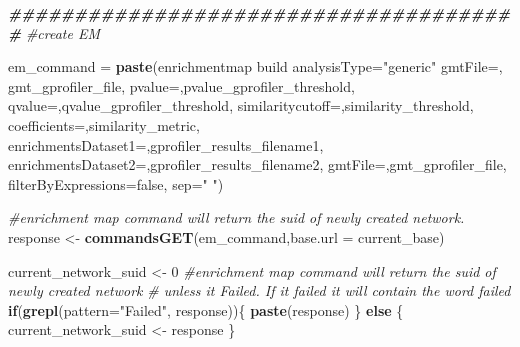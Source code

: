 \documentclass[
]{book}
\newenvironment{Shaded}{\begin{snugshade}}{\end{snugshade}}
\newcommand{\AttributeTok}[1]{\textcolor[rgb]{0.13,0.29,0.53}{#1}}
\newcommand{\CommentTok}[1]{\textcolor[rgb]{0.56,0.35,0.01}{\textit{#1}}}
\newcommand{\ControlFlowTok}[1]{\textcolor[rgb]{0.13,0.29,0.53}{\textbf{#1}}}
\newcommand{\DecValTok}[1]{\textcolor[rgb]{0.00,0.00,0.81}{#1}}
\newcommand{\DocumentationTok}[1]{\textcolor[rgb]{0.56,0.35,0.01}{\textbf{\textit{#1}}}}
\newcommand{\FunctionTok}[1]{\textcolor[rgb]{0.13,0.29,0.53}{\textbf{#1}}}
\newcommand{\NormalTok}[1]{#1}
\newcommand{\OtherTok}[1]{\textcolor[rgb]{0.56,0.35,0.01}{#1}}
\newcommand{\StringTok}[1]{\textcolor[rgb]{0.31,0.60,0.02}{#1}}
\begin{document}
\begin{Shaded}
\begin{Highlighting}[]
\DocumentationTok{\#\#\#\#\#\#\#\#\#\#\#\#\#\#\#\#\#\#\#\#\#\#\#\#\#\#\#\#\#\#\#\#\#\#\#\#\#\#\#}
\CommentTok{\#create EM}

\NormalTok{em\_command }\OtherTok{=} \FunctionTok{paste}\NormalTok{(}\StringTok{\textquotesingle{}enrichmentmap build analysisType="generic" gmtFile=\textquotesingle{}}\NormalTok{,}
\NormalTok{                   gmt\_gprofiler\_file,}
                   \StringTok{\textquotesingle{}pvalue=\textquotesingle{}}\NormalTok{,pvalue\_gprofiler\_threshold, }
                   \StringTok{\textquotesingle{}qvalue=\textquotesingle{}}\NormalTok{,qvalue\_gprofiler\_threshold,}
                   \StringTok{\textquotesingle{}similaritycutoff=\textquotesingle{}}\NormalTok{,similarity\_threshold,}
                   \StringTok{\textquotesingle{}coefficients=\textquotesingle{}}\NormalTok{,similarity\_metric,}
                   \StringTok{\textquotesingle{}enrichmentsDataset1=\textquotesingle{}}\NormalTok{,gprofiler\_results\_filename1, }
                   \StringTok{\textquotesingle{}enrichmentsDataset2=\textquotesingle{}}\NormalTok{,gprofiler\_results\_filename2,}
                   \StringTok{\textquotesingle{}gmtFile=\textquotesingle{}}\NormalTok{,gmt\_gprofiler\_file,}
                   \StringTok{\textquotesingle{}filterByExpressions=false\textquotesingle{}}\NormalTok{,}
                   \AttributeTok{sep=}\StringTok{" "}\NormalTok{)}

\CommentTok{\#enrichment map command will return the suid of newly created network.}
\NormalTok{response }\OtherTok{\textless{}{-}} \FunctionTok{commandsGET}\NormalTok{(em\_command,}\AttributeTok{base.url =}\NormalTok{ current\_base)}

\NormalTok{current\_network\_suid }\OtherTok{\textless{}{-}} \DecValTok{0}
\CommentTok{\#enrichment map command will return the suid of newly created network }
\CommentTok{\# unless it Failed.  If it failed it will contain the word failed}
\ControlFlowTok{if}\NormalTok{(}\FunctionTok{grepl}\NormalTok{(}\AttributeTok{pattern=}\StringTok{"Failed"}\NormalTok{, response))\{}
  \FunctionTok{paste}\NormalTok{(response)}
\NormalTok{\} }\ControlFlowTok{else}\NormalTok{ \{}
\NormalTok{  current\_network\_suid }\OtherTok{\textless{}{-}}\NormalTok{ response}
\NormalTok{\}}


\end{Highlighting}
\end{Shaded}
\end{document}
